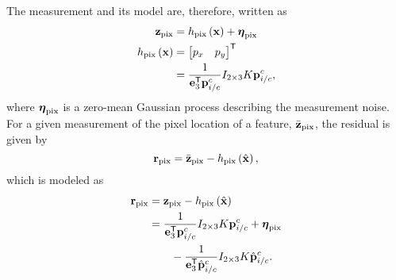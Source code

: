 The measurement and its model are, therefore, written as
\begin{align}
  \boldsymbol{\mathrm{z}}_{\text{pix}} 
  &= h_{\text{pix}} \left( \boldsymbol{\mathrm{x}} \right) + \boldsymbol{\mathrm{\eta}}_{\text{pix}} \\
  h_{\text{pix}} \left( \boldsymbol{\mathrm{x}} \right)
  &= \begin{bmatrix} p_x & p_y \end{bmatrix}^{\mathsf{T}} \\
  &= \frac{1}{\boldsymbol{\mathrm{e}}_3^{\mathsf{T}} \boldsymbol{\mathrm{p}}_{i/c}^c} I_{2 \times 3} K
  \boldsymbol{\mathrm{p}}_{i/c}^c,
\end{align}
where $\boldsymbol{\mathrm{\eta}}_{\text{pix}}$ is a zero-mean Gaussian process describing the
measurement noise.
For a given measurement of the pixel location of a feature,
$\bar{\boldsymbol{\mathrm{z}}}_{\text{pix}}$, the residual is given by
\begin{equation}
  \boldsymbol{\mathrm{r}}_{\text{pix}} = \bar{\boldsymbol{\mathrm{z}}}_{\text{pix}} - h_{\text{pix}} \left( \hat{\boldsymbol{\mathrm{x}}}
    \right),
\end{equation}
which is modeled as
\begin{align}
  \vect{r}_{\text{pix}} &= \vect{z}_{\text{pix}} - h_{\text{pix}} \left( \hat{\x}
    \right) \\
  &= \frac{1}{\e_3^\transpose \vect{p}_{i/c}^c} I_{2 \times 3} K
  \vect{p}_{i/c}^c + \vect{\eta}_{\text{pix}} \\
  & \qquad - \frac{1}{\e_3^\transpose \hat{\vect{p}}_{i/c}^c} I_{2 \times 3} K
  \hat{\vect{p}}_{i/c}^c. \nonumber
  \label{eq:rpix}
\end{align}
